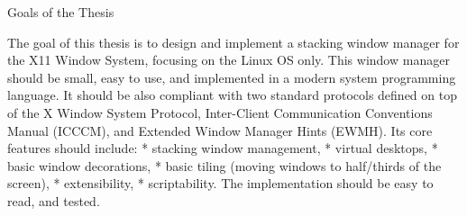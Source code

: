 
%





\nonum
\sec Goals of the Thesis

The goal of this thesis is to design and implement a stacking window manager for the X11 Window System,
focusing on the Linux OS only.
This window manager should be small, easy to use, and implemented in a modern system programming language.
It should be also compliant with two standard protocols defined on top of the X Window System Protocol,
Inter-Client Communication Conventions Manual (ICCCM), and Extended Window Manager Hints (EWMH).
Its core features should include:
\begitems
* stacking window management,
* virtual desktops,
* basic window decorations,
* basic tiling (moving windows to half/thirds of the screen),
* extensibility,
* scriptability.
\enditems
The implementation should be easy to read, and tested.

